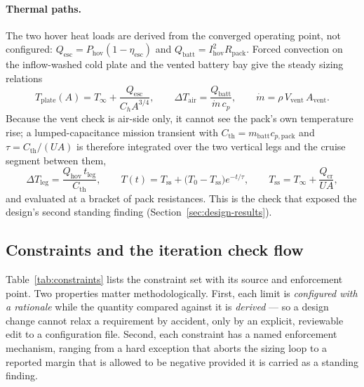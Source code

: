 \paragraph{Thermal paths.} The two hover heat loads are derived from
the converged operating point, not configured:
$Q_{\mathrm{esc}} = P_{\mathrm{hov}}(1-\eta_{\mathrm{esc}})$ and
$Q_{\mathrm{batt}} = I_{\mathrm{hov}}^{2}R_{\mathrm{pack}}$. Forced
convection on the inflow-washed cold plate and the vented battery bay
give the steady sizing relations
\begin{equation}
T_{\mathrm{plate}}(A) = T_\infty + \frac{Q_{\mathrm{esc}}}{C_h A^{3/4}},
\qquad
\Delta T_{\mathrm{air}} = \frac{Q_{\mathrm{batt}}}{\dot{m}\,c_p},
\qquad
\dot{m} = \rho\,V_{\mathrm{vent}}\,A_{\mathrm{vent}} .
\label{eq:thermalss}
\end{equation}
Because the vent check is air-side only, it cannot see the pack's own
temperature rise; a lumped-capacitance mission transient with
$C_{\mathrm{th}} = m_{\mathrm{batt}}c_{p,\mathrm{pack}}$ and
$\tau = C_{\mathrm{th}}/(UA)$ is therefore integrated over the two
vertical legs and the cruise segment between them,
\begin{equation}
\Delta T_{\mathrm{leg}} = \frac{Q_{\mathrm{hov}}\,t_{\mathrm{leg}}}
                               {C_{\mathrm{th}}},
\qquad
T(t) = T_{\mathrm{ss}} + \big(T_0-T_{\mathrm{ss}}\big)e^{-t/\tau},
\qquad
T_{\mathrm{ss}} = T_\infty + \frac{Q_{\mathrm{cr}}}{UA},
\label{eq:transient}
\end{equation}
and evaluated at a bracket of pack resistances. This is the check that
exposed the design's second standing finding
(Section~\ref{sec:design-results}).

\subsection{Constraints and the iteration check flow}
\label{sec:checks}

Table~\ref{tab:constraints} lists the constraint set with its source
and enforcement point. Two properties matter methodologically. First,
each limit is \emph{configured with a rationale} while the quantity
compared against it is \emph{derived} --- so a design change cannot
relax a requirement by accident, only by an explicit, reviewable edit
to a configuration file. Second, each constraint has a named
enforcement mechanism, ranging from a hard exception that aborts the
sizing loop to a reported margin that is allowed to be negative
provided it is carried as a standing finding.

